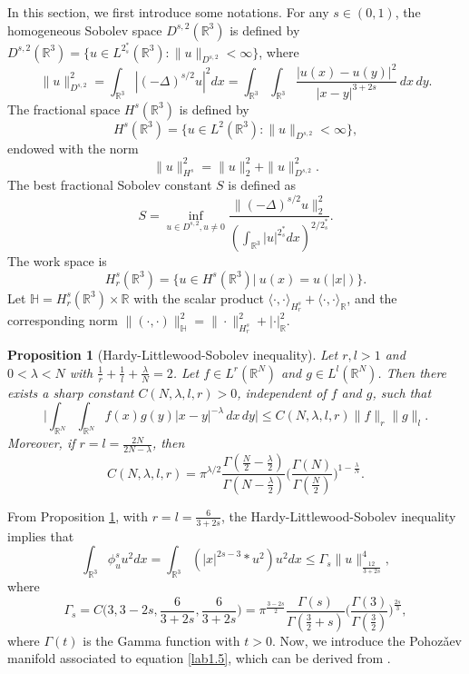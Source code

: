 \documentclass[10pt,a4paper]{amsart}
\numberwithin{equation}{section}
\newtheorem{proposition}[theorem]{Proposition}
\begin{document}
In this section, we first introduce  some  notations. For any $s\in(0,1)$, the
homogeneous Sobolev space $D^{s,2}(\mathbb{R}^3)$ is defined by
$D^{s,2}(\mathbb{R}^3)=\{u\in L^{2^*_s}(\mathbb{R}^3):\|u\|_{D^{s,2}}<\infty\}$,
where
$$
\|u\|^2_{D^{s,2}}=\int_{\mathbb{R}^3}|(-\Delta)^{s/2}u|^2dx
=\int_{\mathbb{R}^3}\int_{\mathbb{R}^3}\frac{|u(x)-u(y)|^2}{|x-y|^{3+2s}}\,dx\,dy.
$$
The fractional space $H^s(\mathbb{R}^3)$ is defined by
$$
H^s(\mathbb{R}^3)=\{u\in L^2(\mathbb{R}^3): \|u\|_{D^{s,2}}< \infty \},
$$
endowed with the norm
$$
\|u\|^2_{H^s}=\|u\|^2_2+\|u\|^2_{D^{s,2}}.
$$
The best fractional Sobolev constant $S$ is defined as
\begin{equation}\label{2.111}
S=\inf_{u\in D^{s,2}, u\neq 0}
\frac{\|(-\Delta)^{s/2}u\|^2_2}
{(\int_{\mathbb{R}^3}|u|^{2^*_s}dx)^{2/2^*_s}}.
\end{equation}
The work space is
 $$
 H^s_r(\mathbb{R}^3)=\{u \in H^s(\mathbb{R}^3)|~ u(x)=u(|x|)\}.
 $$
Let $\mathbb{H}=H^s_r(\mathbb{R}^3) \times \mathbb{R}$ with the scalar product
$\langle\cdot, \cdot\rangle_{H^s_r}+\langle\cdot, \cdot\rangle_{\mathbb{R}}$, and
the corresponding norm
$\|(\cdot, \cdot)\|^2_\mathbb{H}=\|\cdot\|^2_{H^s_r}+|\cdot|^2_{\mathbb{R}}$.

\begin{proposition}[Hardy-Littlewood-Sobolev inequality] \label{pro2.1}
Let $r,l>1$ and $0<\lambda <N$ with $\frac{1}{r}+\frac{1}{l}+\frac{\lambda}{N}=2$.
Let $f\in L^r(\mathbb{R}^N)$ and $g\in L^l(\mathbb{R}^N)$.
Then there exists a sharp constant $C(N, \lambda, l, r)>0$, independent of $f$ and $g$,
such that
\[
\Big|\int_{\mathbb{R}^N}\int_{\mathbb{R}^N}f(x)g(y)|x-y|^{-\lambda}\,dx\,dy\Big|
\leq C(N, \lambda, l, r)\|f\|_{r}\|g\|_{l}.
\]
Moreover, if $r=l=\frac{2N}{2N-\lambda}$, then
\[
C(N, \lambda, l, r)
=\pi^{\lambda/2}\frac{\Gamma(\frac{N}{2}-\frac{\lambda}{2})}
{\Gamma(N-\frac{\lambda}{2})}\Big(\frac{\Gamma(N)}{\Gamma(\frac{N}{2})}
\Big)^{1-\frac{\lambda}{N}}.
\]
\end{proposition}

From Proposition \ref{pro2.1},  with  $r=l=\frac{6}{3+2s}$, the
 Hardy-Littlewood-Sobolev inequality implies that
\begin{equation}\label{3.3}
\int_{\mathbb{R}^3}\phi^s_u u^2dx=\int_{\mathbb{R}^3}
\left(|x|^{2s-3}\ast u^2\right)u^2dx\leq \Gamma_s\|u\|^4_{\frac{12}{3+2s}},
\end{equation}
where
\[
\Gamma_s=C\big(3, 3-2s, \frac{6}{3+2s}, \frac{6}{3+2s}\big)=\pi^{\frac{3-2s}{2}}
\frac{\Gamma(s)}{\Gamma(\frac{3}{2}+s)}\Big(\frac{\Gamma(3)}
{\Gamma(\frac{3}{2})}\Big)^{\frac{2s}{3}},
\]
where $\Gamma(t)$ is  the Gamma function with $t>0$.
Now, we introduce the Pohoz{\v{a}}ev manifold associated to equation  \eqref{lab1.5},
which can be derived from \cite{T7899}.
\end{document}
